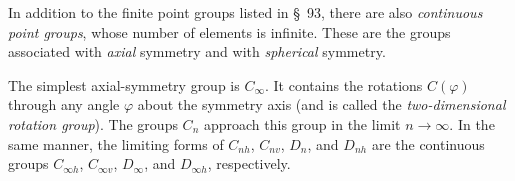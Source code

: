 In addition to the finite point groups listed in §~93, there are also \emph{continuous point groups}, whose number of elements is infinite. These are the groups associated with \emph{axial} symmetry and with \emph{spherical} symmetry.

The simplest axial-symmetry group is $C_\infty$. It contains the rotations $C(\varphi)$ through any angle $\varphi$ about the symmetry axis (and is called the \emph{two-dimensional rotation group}). The groups $C_n$ approach this group in the limit $n\to\infty$. In the same manner, the limiting forms of $C_{nh}$, $C_{nv}$, $D_n$, and $D_{nh}$ are the continuous groups $C_{\infty h}$, $C_{\infty v}$, $D_\infty$, and $D_{\infty h}$, respectively.
